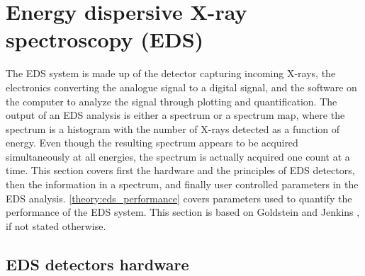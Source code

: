 

















\clearpage


\section{Energy dispersive X-ray spectroscopy (EDS)}
\label{theory:eds}



The EDS system is made up of the detector capturing incoming X-rays, the electronics converting the analogue signal to a digital signal, and the software on the computer to analyze the signal through plotting and quantification.
The output of an EDS analysis is either a spectrum or a spectrum map, where the spectrum is a histogram with the number of X-rays detected as a function of energy.
Even though the resulting spectrum appears to be acquired simultaneously at all energies, the spectrum is actually acquired one count at a time.
This section covers first the hardware and the principles of EDS detectors, then the information in a spectrum, and finally user controlled parameters in the EDS analysis.
\cref{theory:eds_performance} covers parameters used to quantify the performance of the EDS system. 
This section is based on Goldstein \cite{goldstein_scanning_2018} and Jenkins \cite{jenkins_xrayspectroscopy}, if not stated otherwise.




\subsection{EDS detectors hardware}
\label{theory:eds:hardware}


